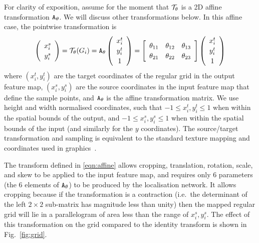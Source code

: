 \documentclass{article} %
\newcommand{\figref}[1]{Fig.~\ref{#1}}
\def\mat#1{\mathchoice{\mbox{\boldmath$\displaystyle\tt#1$}}
{\mbox{\boldmath$\textstyle\tt#1$}}
{\mbox{\boldmath$\scriptstyle\tt#1$}}
{\mbox{\boldmath$\scriptscriptstyle\tt#1$}}}
\def\m#1{\protect\mat #1}
\begin{document}
For clarity of exposition, assume for the moment that ${\cal T}_\theta$ is a
2D affine transformation $\m A_\theta$. We will discuss other transformations below.
In this affine case, the pointwise transformation is
\begin{equation}
\left( {
\renewcommand{\arraystretch}{1.2}
\begin{array}{c}
x_i^s\\
y_i^s
\end{array}
}\right)
= {\cal T}_\theta (G_i)
= \m A_\theta
\left( {
\renewcommand{\arraystretch}{1.2}
\begin{array}{c}
x^t_i\\
y^t_i\\
1
\end{array}
}\right)
=
\left[ {
\renewcommand{\arraystretch}{1.2}
\begin{array}{ccc}
\theta_{11} & \theta_{12} & \theta_{13}\\
\theta_{21} & \theta_{22} & \theta_{23}
\end{array}
}\right]
\left( {
\renewcommand{\arraystretch}{1.2}
\begin{array}{c}
x^t_i\\
y^t_i\\
1
\end{array}
}\right)
\label{eqn:affine}
\end{equation}
where $(x_i^t, y_i^t)$ are the target coordinates of the regular grid
in the output feature map, $(x_i^s,y_i^s)$ are the source
coordinates in the input feature map that define the sample points, and $\m A_\theta$
is the affine transformation matrix. We use height and width normalised
coordinates, such that $-1 \le x_i^t, y_i^t \le 1$ when within the spatial bounds of
the output, and $-1 \le x_i^s, y_i^s \le 1$ when within the spatial bounds of the
input (and similarly for the $y$ coordinates).
The source/target transformation and sampling is equivalent to the
standard texture mapping and coordinates used in graphics~\cite{Foley94}.

The transform defined in \eqref{eqn:affine} allows cropping,
translation, rotation, scale, and skew to be applied to the input
feature map, and requires only 6 parameters (the 6 elements of $\m A_\theta$) to
be produced by the localisation network. It allows cropping because
if the transformation is a contraction (i.e.\ the determinant of
the left $2 \times 2$ sub-matrix has magnitude less than unity)
then the mapped regular grid will lie in a parallelogram of area
less than the range of $x_i^s,y_i^s$. The effect of this
transformation on the grid compared to the identity transform is shown
in \figref{fig:grid}.
\end{document}
